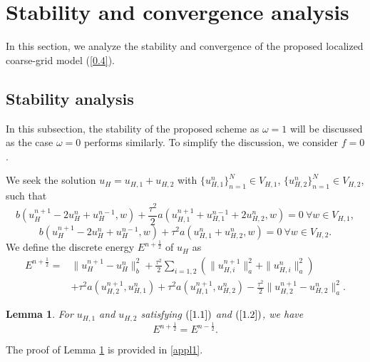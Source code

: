 \documentclass[preprint,12pt]{elsarticle}
\newtheorem{lemma}{Lemma}
\begin{document}
\section{Stability and convergence analysis}\label{004}
In this section, we analyze the stability and convergence of the proposed localized coarse-grid model (\ref{0.4}). 
\subsection{Stability analysis}
In this subsection, the stability of the proposed scheme as $\omega=1$ will be discussed as the case $\omega=0$ performs similarly. To simplify the discussion, we consider $f=0$. 


We seek the solution $u_{H}=u_{H,1}+u_{H,2}$ with $\{u_{H,1}^{n}\}_{n=1}^N \in V_{H,1}$, $\{u_{H,2}^{n}\}_{n=1}^N \in V_{H,2}$, such that
\begin{equation}\label{1.1}
    b\left(u_{H}^{n+1}-2u_{H}^{n}+u_{H}^{n-1},w\right)+\frac{\tau^2}{2}a\left(u_{H,1}^{n+1}+u_{H,1}^{n-1}+2u_{H,2}^{n},w\right)=0~ \forall w \in V_{H,1},
\end{equation}
\begin{equation}\label{1.2}
    b\left(u_{H}^{n+1}-2u_{H}^{n}+u_{H}^{n-1},w\right)+\tau^2 a\left(u_{H,1}^{n}+u_{H,2}^{n},w\right)=0~\forall w \in V_{H,2}.
\end{equation}
We define the discrete energy $E^{n+\frac{1}{2}}$ of $u_{H}$ as
\begin{equation}\label{1.3}
\begin{aligned}
     E^{n+\frac{1}{2}}=&\|u_{H}^{n+1}-u_{H}^{n}\|_{b}^2+\frac{\tau^2}{2}\sum_{i=1,2}\left(\|u_{H,i}^{n+1}\|_{a}^2+\|u_{H,i}^{n}\|_{a}^2\right)\\
     &+\tau^2 a(u_{H,2}^{n+1},u_{H,1}^{n})+\tau^2 a(u_{H,1}^{n+1},u_{H,2}^{n})-\frac{\tau^2}{2}\|u_{H,2}^{n+1}-u_{H,2}^{n}\|_{a}^2.
\end{aligned}
\end{equation}


\begin{lemma}\label{lemma1}
    For $u_{H,1}$ and $u_{H,2}$ satisfying $(\ref{1.1})$ and $(\ref{1.2})$, we have $$E^{n+\frac{1}{2}}=E^{n-\frac{1}{2}}.$$ 
\end{lemma}
The proof of Lemma \ref{lemma1} is provided in \ref{appl1}.
\end{document}
